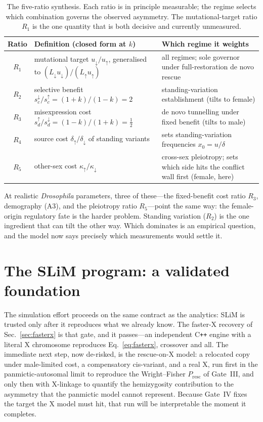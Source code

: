 \documentclass[11pt,a4paper]{article}
\newcommand{\Presc}{P_{\mathrm{resc}}}
\begin{document}
\begin{table}[h!]
\centering\small
\caption{The five-ratio synthesis. Each ratio is in principle measurable; the regime selects which combination governs the observed asymmetry. The mutational-target ratio $R_1$ is the one quantity that is both decisive and currently unmeasured.}
\label{tab:fiveratio}
\begin{tabular}{c p{4.8cm} p{6.4cm}}
\toprule
\textbf{Ratio} & \textbf{Definition (closed form at $k$)} & \textbf{Which regime it weights} \\
\midrule
$R_1$ & mutational target $u_{\downarrow}/u_{\uparrow}$, generalised to $(L_{\downarrow}u_{\downarrow})/(L_{\uparrow}u_{\uparrow})$ & all regimes; sole governor under full-restoration de novo rescue \\
$R_2$ & selective benefit $s_c^{\downarrow}/s_c^{\uparrow}=(1{+}k)/(1{-}k)=2$ & standing-variation establishment (tilts to female) \\
$R_3$ & misexpression cost $s_d^{\uparrow}/s_d^{\downarrow}=(1{-}k)/(1{+}k)=\tfrac12$ & de novo tunnelling under fixed benefit (tilts to male) \\
$R_4$ & source cost $\delta_{\uparrow}/\delta_{\downarrow}$ of standing variants & sets standing-variation frequencies $x_0=u/\delta$ \\
$R_5$ & other-sex cost $\kappa_{\uparrow}/\kappa_{\downarrow}$ & cross-sex pleiotropy; sets which side hits the conflict wall first (female, here) \\
\bottomrule
\end{tabular}
\end{table}

At realistic \emph{Drosophila} parameters, three of these---the fixed-benefit cost ratio $R_3$, demography (A3), and the pleiotropy ratio $R_5$---point the same way: the female-origin regulatory fate is the harder problem. Standing variation ($R_2$) is the one ingredient that can tilt the other way. Which dominates is an empirical question, and the model now says precisely which measurements would settle it.

\section{The SLiM program: a validated foundation}

The simulation effort proceeds on the same contract as the analytics: SLiM is trusted only after it reproduces what we already know. The faster-X recovery of Sec.~\ref{sec:fasterx} is that gate, and it passes---an independent C\texttt{++} engine with a literal X chromosome reproduces Eq.~\eqref{eq:fasterx}, crossover and all. The immediate next step, now de-risked, is the rescue-on-X model: a relocated copy under male-limited cost, a compensatory cis-variant, and a real X, run first in the panmictic-autosomal limit to reproduce the Wright--Fisher $\Presc$ of Gate~III, and only then with X-linkage to quantify the hemizygosity contribution to the asymmetry that the panmictic model cannot represent. Because Gate~IV fixes the target the X model must hit, that run will be interpretable the moment it completes.
\end{document}
